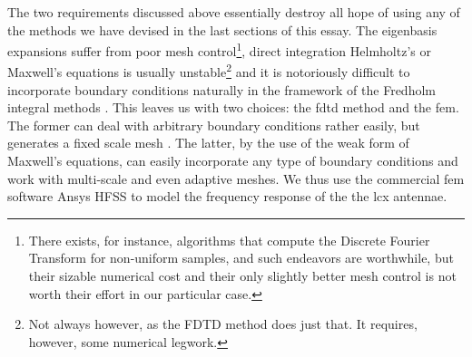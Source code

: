 The two requirements discussed above essentially destroy all hope of using any
of the methods we have devised in the last sections of this essay. The eigenbasis
expansions suffer from poor mesh control\footnote{There exists, for instance, 
algorithms that compute the Discrete Fourier Transform for non-uniform
samples, and such endeavors are worthwhile, but their sizable numerical
cost and their only slightly better mesh control is not worth their effort in 
our particular case.}, direct integration Helmholtz's or Maxwell's equations
is usually unstable\footnote{Not always however, as the FDTD method does just that.
It requires, however, some numerical legwork.} and it is notoriously difficult
to incorporate boundary conditions naturally in the framework of the Fredholm 
integral methods \cite{VAN1991,MAR2003}. This leaves us with two choices: the \gls{fdtd}
method and the \gls{fem}. The former can deal with arbitrary boundary conditions
rather easily, but generates a fixed scale mesh \cite{OSK2010}. The latter, by the use of the weak
form of Maxwell's equations, can easily incorporate any type of boundary conditions
and work with multi-scale and even adaptive meshes. We thus use the commercial \gls{fem}
software Ansys HFSS to model the frequency response of the the \gls{lcx} antennae.


